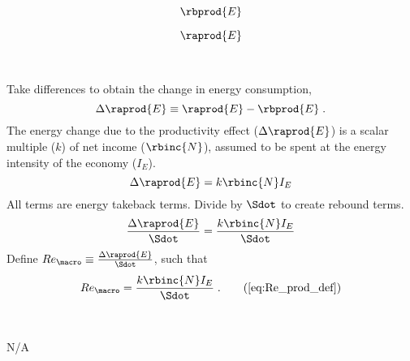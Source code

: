 

\begin{landscape}

\linespread{1}


\sectionsep{}

{
\begin{equation}
  \rbprod{E}
\end{equation}
}
{
}

\sectionsep{}

{
\begin{equation}
\raprod{E}
\end{equation}
}
{
}

\sectionsep{}

\derivsection{}
{
~

Take differences to obtain the change in energy consumption,
%
\begin{equation}
  \Delta \raprod{E} \equiv \raprod{E} - \rbprod{E} \; .
\end{equation}
%
The energy change due to the productivity effect ($\Delta \raprod{E}$) 
is a scalar multiple ($k$) of net income ($\rbinc{N}$), 
assumed to be spent at the energy intensity of the economy ($I_E$).
%
\begin{equation}
  \Delta \raprod{E} = k \rbinc{N} I_E
\end{equation}
%
All terms are energy takeback terms.
Divide by $\Sdot$
to create rebound terms.
%
\begin{equation}
  \frac{\Delta \raprod{E}}{\Sdot} = \frac{k \rbinc{N} I_E}{\Sdot}
\end{equation}
%
Define 
$Re_{\macro} \equiv \frac{\Delta \raprod{E}}{\Sdot}$, 
such that
%
\begin{equation}
  Re_{\macro} = \frac{k \rbinc{N} I_E}{\Sdot} \; . \tag{\ref{eq:Re_prod_def}}
\end{equation}
%
}
{
~
\centering

N/A
}
\end{landscape}
